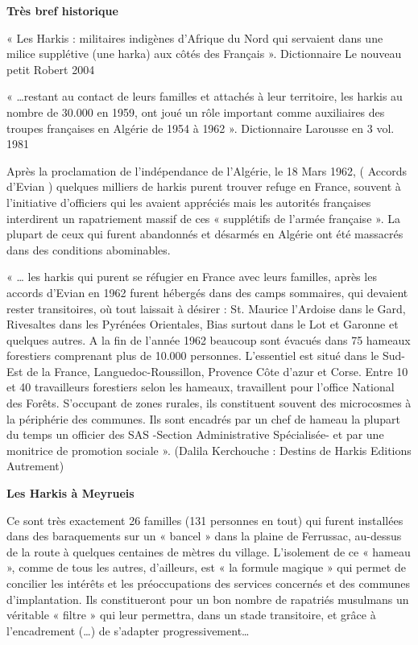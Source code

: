 
\vspace{5mm}

\textbf{Très bref historique}

« Les Harkis : militaires indigènes d’Afrique du Nord qui servaient dans une milice
supplétive (une harka) aux côtés des Français ». Dictionnaire Le nouveau petit Robert 2004

« …restant au contact de leurs familles et attachés à leur territoire, les harkis au
nombre de 30.000 en 1959, ont joué un rôle important comme auxiliaires des troupes
françaises en Algérie de 1954 à 1962 ». Dictionnaire Larousse en 3 vol. 1981

Après la proclamation de l’indépendance de l’Algérie, le 18 Mars 1962, ( Accords
d’Evian ) quelques milliers de harkis purent trouver refuge en France, souvent à
l’initiative d’officiers qui les avaient appréciés mais les autorités françaises interdirent
un rapatriement massif de ces « supplétifs de l’armée française ». La plupart de ceux
qui furent abandonnés et désarmés en Algérie ont été massacrés dans des conditions
abominables.

« … les harkis qui purent se réfugier en France avec leurs familles, après les accords
d’Evian en 1962 furent hébergés dans des camps sommaires, qui devaient rester
transitoires, où tout laissait à désirer : St. Maurice l’Ardoise dans le Gard, Rivesaltes
dans les Pyrénées Orientales, Bias surtout dans le Lot et Garonne et quelques autres.
A la fin de l’année 1962 beaucoup sont évacués dans 75 hameaux forestiers
comprenant plus de 10.000 personnes. L’essentiel est situé dans le Sud-Est de la
France, Languedoc-Roussillon, Provence Côte d’azur et Corse. Entre 10 et 40
travailleurs forestiers selon les hameaux, travaillent pour l’office National des
Forêts. S’occupant de zones rurales, ils constituent souvent des microcosmes à la
périphérie des communes. Ils sont encadrés par un chef de hameau la plupart du temps
un officier des SAS -Section Administrative Spécialisée- et par une monitrice de promotion
sociale ». (Dalila Kerchouche : Destins de Harkis Editions Autrement)

\textbf{Les Harkis à Meyrueis}

Ce sont très exactement 26 familles (131 personnes en tout) qui furent installées dans
des baraquements sur un « bancel » dans la plaine de Ferrussac, au-dessus de la route
à quelques centaines de mètres du village. L’isolement de ce « hameau », comme de
tous les autres, d’ailleurs, est « la formule magique » qui permet de concilier les
intérêts et les préoccupations des services concernés et des communes d’implantation.
Ils constitueront pour un bon nombre de rapatriés musulmans un véritable « filtre »
qui leur permettra, dans un stade transitoire, et grâce à l’encadrement (…) de
s’adapter progressivement…

